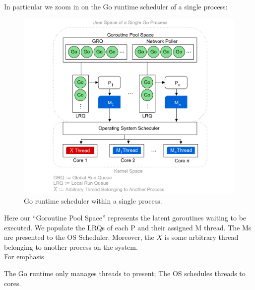 \newpage 
\noindent
In particular we zoom in on the Go runtime scheduler of a single process: 
\begin{figure}[h]
    
    \hspace{-3em}
    \includegraphics[width=1.1\textwidth]{Sections/rpc/sheduler.png}
    \caption{Go runtime scheduler within a single process.}
    \label{fig:scheduler}
\end{figure}

\noindent
Here our ``Goroutine Pool Space'' represents the latent goroutines waiting to be executed. 
We populate the LRQs of each P and their assigned M thread. The Ms are presented to the OS Scheduler. Moreover, 
the $X$ is some arbitrary thread belonging to another process on the system.\\
For emphasis
\begin{theo}

    The Go runtime only manages threads to present; The OS schedules threads to cores.
\end{theo}
\newpage 

